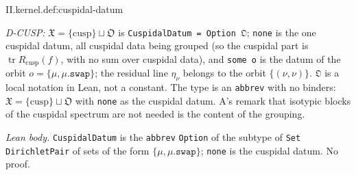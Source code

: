 \begin{definition}
\end{definition}
\begin{tfformal}{II.kernel.def:cuspidal-datum}
\begin{tffidelity}
\emph{D-CUSP:} $\mathfrak X=\{\mathrm{cusp}\}\sqcup\mathfrak O$ is \texttt{CuspidalDatum = Option 𝔒}; \texttt{none} is the one cuspidal datum, all cuspidal data being grouped (so the cuspidal part is $\operatorname{tr}R_{\mathrm{cusp}}(f)$, with no sum over cuspidal data), and \texttt{some o} is the datum of the orbit $o=\{\mu,\mu.\texttt{swap}\}$; the residual line $\eta_\nu$ belongs to the orbit $\{(\nu,\nu)\}$. \texttt{𝔒} is a local notation in Lean, not a constant. The type is an \texttt{abbrev} with no binders: $\mathfrak X=\{\mathrm{cusp}\}\sqcup\mathfrak O$ with \texttt{none} as the cuspidal datum. A's remark that isotypic blocks of the cuspidal spectrum are not needed is the content of the grouping.
\end{tffidelity}
\end{tfformal}
\noindent\emph{Lean body.} \texttt{CuspidalDatum} is the \texttt{abbrev} \texttt{Option} of the subtype of \texttt{Set DirichletPair} of sets of the form $\{\mu,\mu.\texttt{swap}\}$; \texttt{none} is the cuspidal datum. No proof.

